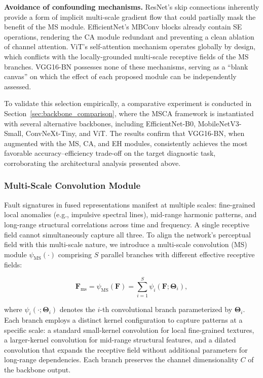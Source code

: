 \documentclass[journal]{IEEEtran}
\begin{document}
\textbf{Avoidance of confounding mechanisms.} ResNet's skip connections inherently provide a form of implicit multi-scale gradient flow that could partially mask the benefit of the MS module. EfficientNet's MBConv blocks already contain SE operations, rendering the CA module redundant and preventing a clean ablation of channel attention. ViT's self-attention mechanism operates globally by design, which conflicts with the locally-grounded multi-scale receptive fields of the MS branches. VGG16-BN possesses none of these mechanisms, serving as a ``blank canvas'' on which the effect of each proposed module can be independently assessed.

To validate this selection empirically, a comparative experiment is conducted in Section~\ref{sec:backbone_comparison}, where the MSCA framework is instantiated with several alternative backbones, including EfficientNet-B0, MobileNetV3-Small, ConvNeXt-Tiny, and ViT. The results confirm that VGG16-BN, when augmented with the MS, CA, and EH modules, consistently achieves the most favorable accuracy--efficiency trade-off on the target diagnostic task, corroborating the architectural analysis presented above.

\subsubsection{Multi-Scale Convolution Module}

Fault signatures in fused representations manifest at multiple scales: fine-grained local anomalies (e.g., impulsive spectral lines), mid-range harmonic patterns, and long-range structural correlations across time and frequency. A single receptive field cannot simultaneously capture all three. To align the network's perceptual field with this multi-scale nature, we introduce a multi-scale convolution (MS) module $\psi_{\mathrm{MS}}(\cdot)$ comprising $S$ parallel branches with different effective receptive fields:

\begin{equation}
\boldsymbol{F}_{\mathrm{ms}} = \psi_{\mathrm{MS}}(\boldsymbol{F}) = \sum_{i=1}^{S} \psi_i(\boldsymbol{F}; \boldsymbol{\Theta}_i),
\label{eq:multi_scale_feature}
\end{equation}

where $\psi_i(\cdot; \boldsymbol{\Theta}_i)$ denotes the $i$-th convolutional branch parameterized by $\boldsymbol{\Theta}_i$. Each branch employs a distinct kernel configuration to capture patterns at a specific scale: a standard small-kernel convolution for local fine-grained textures, a larger-kernel convolution for mid-range structural features, and a dilated convolution that expands the receptive field without additional parameters for long-range dependencies. Each branch preserves the channel dimensionality $C$ of the backbone output.
\end{document}
